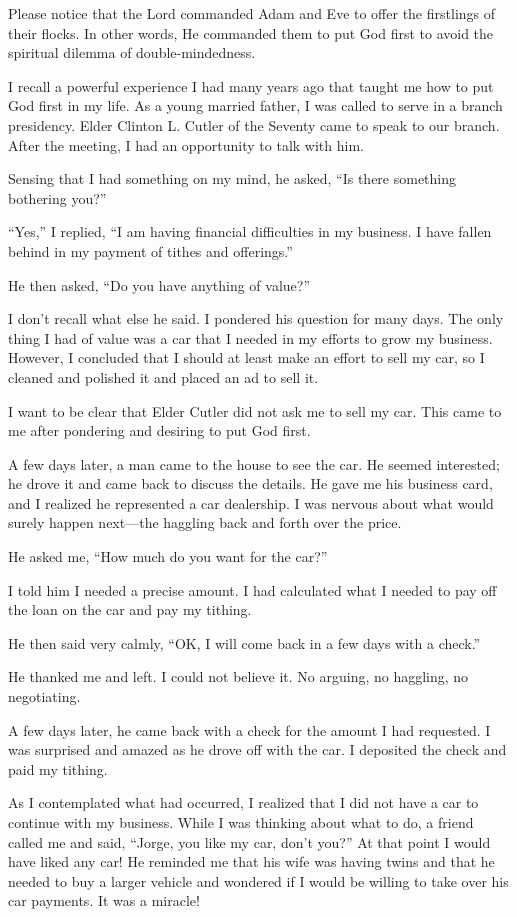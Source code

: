 \documentclass[letterpaper, 11pt]{report}
\begin{document}
Please notice that the Lord commanded Adam and Eve to offer the firstlings of their flocks. In other words, He commanded them to put God first to avoid the spiritual dilemma of double-mindedness.

I recall a powerful experience I had many years ago that taught me how to put God first in my life. As a young married father, I was called to serve in a branch presidency. Elder Clinton L. Cutler of the Seventy came to speak to our branch. After the meeting, I had an opportunity to talk with him.

Sensing that I had something on my mind, he asked, “Is there something bothering you?”

“Yes,” I replied, “I am having financial difficulties in my business. I have fallen behind in my payment of tithes and offerings.”

He then asked, “Do you have anything of value?”

I don’t recall what else he said. I pondered his question for many days. The only thing I had of value was a car that I needed in my efforts to grow my business. However, I concluded that I should at least make an effort to sell my car, so I cleaned and polished it and placed an ad to sell it.

I want to be clear that Elder Cutler did not ask me to sell my car. This came to me after pondering and desiring to put God first.

A few days later, a man came to the house to see the car. He seemed interested; he drove it and came back to discuss the details. He gave me his business card, and I realized he represented a car dealership. I was nervous about what would surely happen next—the haggling back and forth over the price.

He asked me, “How much do you want for the car?”

I told him I needed a precise amount. I had calculated what I needed to pay off the loan on the car and pay my tithing.

He then said very calmly, “OK, I will come back in a few days with a check.”

He thanked me and left. I could not believe it. No arguing, no haggling, no negotiating.

A few days later, he came back with a check for the amount I had requested. I was surprised and amazed as he drove off with the car. I deposited the check and paid my tithing.

As I contemplated what had occurred, I realized that I did not have a car to continue with my business. While I was thinking about what to do, a friend called me and said, “Jorge, you like my car, don’t you?” At that point I would have liked any car! He reminded me that his wife was having twins and that he needed to buy a larger vehicle and wondered if I would be willing to take over his car payments. It was a miracle!
\end{document}
